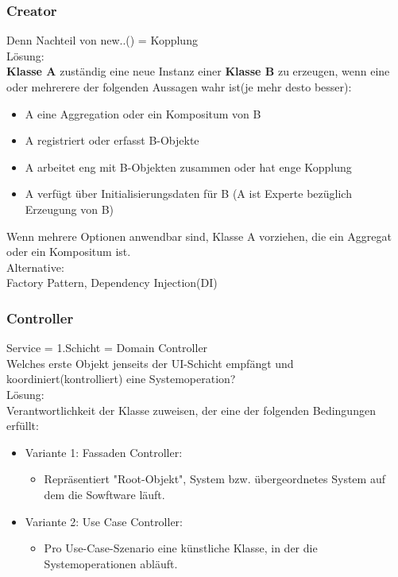 \documentclass[../ZF_SWEN1.tex]{subfiles}
\begin{document}
{{\subsubsection{Creator}
Denn Nachteil von new..() = Kopplung\\
Lösung:\\
\textbf {Klasse A} zuständig eine neue Instanz einer \textbf{Klasse B} zu erzeugen, wenn eine oder mehrerere der folgenden Aussagen wahr ist(je mehr desto besser):\\
\begin{itemize}
	\item A eine Aggregation oder ein Kompositum von B
	\item A registriert oder erfasst B-Objekte
	\item A arbeitet eng mit B-Objekten zusammen oder hat enge Kopplung
	\item A verfügt über Initialisierungsdaten für B (A ist Experte bezüglich Erzeugung von B)
\end{itemize}
Wenn mehrere Optionen anwendbar sind, Klasse A vorziehen, die ein Aggregat oder ein Kompositum ist.\\
Alternative:\\
Factory Pattern, Dependency Injection(DI)

\subsubsection{Controller}

Service = 1.Schicht = Domain Controller\\
Welches erste Objekt jenseits der UI-Schicht empfängt und koordiniert(kontrolliert) eine Systemoperation?\\
Lösung:\\
Verantwortlichkeit der Klasse zuweisen, der eine der folgenden Bedingungen erfüllt:\\
\begin{itemize}
	\item Variante 1: Fassaden Controller:
	\begin{itemize}
		\item Repräsentiert "Root-Objekt", System bzw. übergeordnetes System auf dem die Sowftware läuft.
	\end{itemize}
	\item Variante 2: Use Case Controller:
	\begin{itemize}
		\item Pro Use-Case-Szenario eine künstliche Klasse, in der die Systemoperationen abläuft.
	\end{itemize}
\end{itemize}

}}
\end{document}
